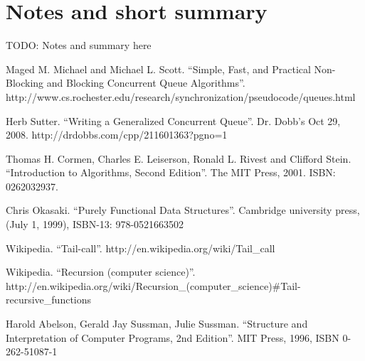 \documentclass{article}
\begin{document}
\section{Notes and short summary}

TODO: Notes and summary here


\begin{thebibliography}{99}

Maged M. Michael and Michael L. Scott. ``Simple, Fast, and Practical Non-Blocking and Blocking Concurrent Queue Algorithms''. http://www.cs.rochester.edu/research/synchronization/pseudocode/queues.html

Herb Sutter. ``Writing a Generalized Concurrent Queue''. Dr. Dobb's Oct 29, 2008. http://drdobbs.com/cpp/211601363?pgno=1

Thomas H. Cormen, Charles E. Leiserson, Ronald L. Rivest and Clifford Stein. ``Introduction to Algorithms, Second Edition''. The MIT Press, 2001. ISBN: 0262032937.

Chris Okasaki. ``Purely Functional Data Structures''. Cambridge university press, (July 1, 1999), ISBN-13: 978-0521663502

Wikipedia. ``Tail-call''. http://en.wikipedia.org/wiki/Tail\_call

Wikipedia. ``Recursion (computer science)''. http://en.wikipedia.org/wiki/Recursion\_(computer\_science)\#Tail-recursive\_functions

Harold Abelson, Gerald Jay Sussman, Julie Sussman. ``Structure and Interpretation of Computer Programs, 2nd Edition''. MIT Press, 1996, ISBN 0-262-51087-1

\end{thebibliography}

\ifx\wholebook\relax \else
\end{document}
